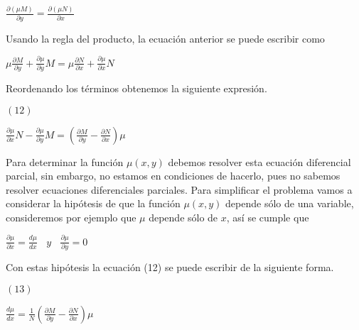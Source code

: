 \documentclass[l etterpaper,11pt]{article}
\begin{document}
\begin{center}

$\frac{\partial(\mu M)}{\partial y}=\frac{\partial(\mu N)}{\partial x}$\\
\end{center}

Usando la regla del producto, la ecuación anterior se puede escribir como
\begin{center}

$\mu\frac{\partial M}{\partial y}+\frac{\partial\mu}{\partial y}M=\mu\frac{\partial N}{\partial x}+\frac{\partial\mu}{\partial x}N$\\
\end{center}

Reordenando los términos obtenemos la siguiente expresión.
\begin{flushleft} 
$(12)$
\end{flushleft}

\begin{center}

$\frac{\partial\mu}{\partial x}N-\frac{\partial\mu}{\partial y}M=(\frac{\partial M}{\partial y}-\frac{\partial N}{\partial x})\mu$\\
\end{center}


Para determinar la función $\mu\left(x,y\right)$ debemos resolver esta ecuación diferencial parcial, sin embargo, no estamos en condiciones de hacerlo, pues no sabemos resolver ecuaciones diferenciales parciales. Para simplificar el problema vamos a considerar la hipótesis de que la función $  \mu\left(x,y\right) $ depende sólo de una variable, consideremos por ejemplo que $\mu$ depende sólo de $ x$, así se cumple que
\begin{center}

$\frac{\partial\mu}{\partial x}=\frac{d\mu}{dx}\ \ \ \ y\ \ \ \ \frac{\partial\mu}{\partial y}=0$\\
\end{center}

Con estas hipótesis la ecuación (12) se puede escribir de la siguiente forma.
\begin{flushleft} 
$(13)$
\end{flushleft}

\begin{center}

$\frac{d\mu}{dx}=\frac{1}{N}(\frac{\partial M}{\partial y}-\frac{\partial N}{\partial x})\mu$\\
\end{center}
\end{document}
